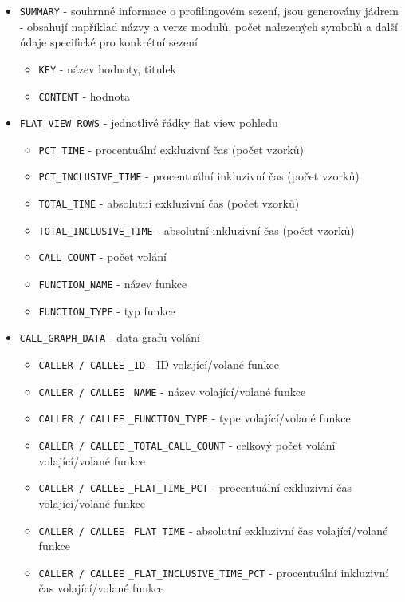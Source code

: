 \documentclass[czech,BP]{thesiskiv}
\begin{document}
\begin{itemize}
\item \texttt{SUMMARY} - souhrnné informace o profilingovém sezení, jsou generovány jádrem - obsahují například názvy a verze modulů, počet nalezených symbolů a další údaje specifické pro konkrétní sezení
	\begin{itemize}
	\item \texttt{KEY} - název hodnoty, titulek
	\item \texttt{CONTENT} - hodnota
	\end{itemize}
\item \texttt{FLAT\_VIEW\_ROWS} - jednotlivé řádky flat view pohledu
	\begin{itemize}
	\item \texttt{PCT\_TIME} - procentuální exkluzivní čas (počet vzorků)
	\item \texttt{PCT\_INCLUSIVE\_TIME} - procentuální inkluzivní čas (počet vzorků)
	\item \texttt{TOTAL\_TIME} - absolutní exkluzivní čas (počet vzorků)
	\item \texttt{TOTAL\_INCLUSIVE\_TIME} - absolutní inkluzivní čas (počet vzorků)
	\item \texttt{CALL\_COUNT} - počet volání
	\item \texttt{FUNCTION\_NAME} - název funkce
	\item \texttt{FUNCTION\_TYPE} - typ funkce
	\end{itemize}
\item \texttt{CALL\_GRAPH\_DATA} - data grafu volání
	\begin{itemize}
	\item \texttt{CALLER / CALLEE} \texttt{\_ID} - ID volající/volané funkce
	\item \texttt{CALLER / CALLEE} \texttt{\_NAME} - název volající/volané funkce
	\item \texttt{CALLER / CALLEE} \texttt{\_FUNCTION\_TYPE} - type volající/volané funkce
	\item \texttt{CALLER / CALLEE} \texttt{\_TOTAL\_CALL\_COUNT} - celkový počet volání volající/volané funkce
	\item \texttt{CALLER / CALLEE} \texttt{\_FLAT\_TIME\_PCT} - procentuální exkluzivní čas volající/volané funkce
	\item \texttt{CALLER / CALLEE} \texttt{\_FLAT\_TIME} - absolutní exkluzivní čas volající/volané funkce
	\item \texttt{CALLER / CALLEE} \texttt{\_FLAT\_INCLUSIVE\_TIME\_PCT} - procentuální inkluzivní čas volající/volané funkce

\end{itemize}
\end{itemize}
\end{document}
